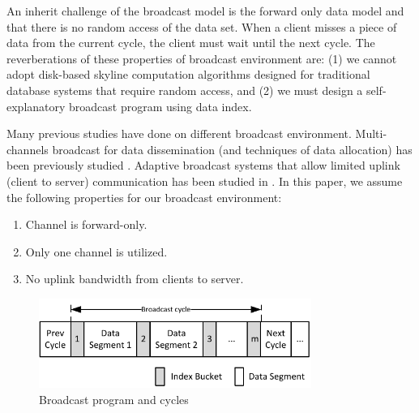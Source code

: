 \documentclass{sig-alternate}
\begin{document}
An inherit challenge of the broadcast model is the forward only data model
and that there is no random access of the data set. When a client misses
a piece of data from the current cycle, the client must wait until the
next cycle. The reverberations of these properties of broadcast environment
are: (1) we cannot adopt disk-based skyline computation algorithms designed
for traditional database systems that require random access, and
(2) we must design a self-explanatory broadcast program using data index.

Many previous studies have done on different broadcast environment.
Multi-channels broadcast for data dissemination
(and techniques of data allocation) has been previously studied
\cite{DBLP:conf/cikm/HsuLC01}
\cite{DBLP:conf/cikm/YeeN03}
\cite{DBLP:conf/mobicom/HameedV97}.
Adaptive broadcast systems that allow limited uplink (client to server)
communication has been studied in
\cite{16350}.
In this paper, we assume the following properties for our broadcast
environment:
\begin{enumerate}
\item Channel is forward-only.
\item Only one channel is utilized.
\item No uplink bandwidth from clients to server.
\end{enumerate}


\begin{figure}[h]
\begin{center}
\includegraphics[width=3.5in]{Figures/bcast_cycle.pdf}
\caption{\small Broadcast program and cycles\label{fig:bcast_cycle}}
\end{center}
\end{figure}
\end{document}
